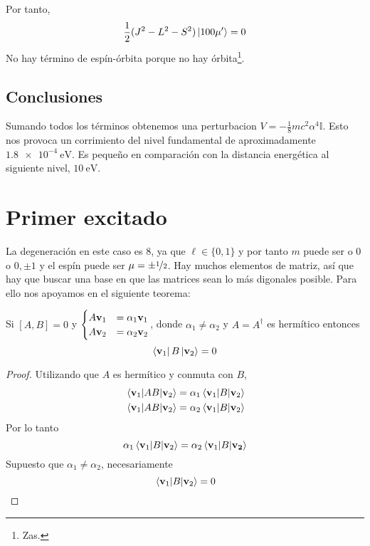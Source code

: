 Por tanto,
\begin{equation}
  \frac{1}{2}(J^2-L^2-S^2) \ket{100\mu'} = 0
\end{equation}
No hay término de espín-órbita porque no hay órbita\footnote{Zas.}.

\subsection{Conclusiones}
Sumando todos los términos obtenemos una perturbacion
$V=-\frac{1}{8}mc^2\alpha^4 \mathbb{I}$. Esto nos provoca un
corrimiento del nivel fundamental de aproximadamente
$\SI{1.8e-4}{\eV}$. Es pequeño en comparación con la distancia
energética al siguiente nivel, $\SI{10}{\eV}$.



\section{Primer excitado}
La degeneración en este caso es 8, ya que $\ell\in\{0,1\}$ y por tanto $m$
puede ser o $0$ o $0,\pm 1$ y el espín puede ser $\mu = \pm
{\nicefrac{1}{2}}$.
Hay muchos elementos de matriz, así que hay que buscar una base en que
las matrices sean lo más digonales posible. Para ello nos apoyamos en
el siguiente teorema:
\begin{thm}
  Si $[A,B]=0$ y $
  \begin{cases}
    A \bm{\mathrm{v}}_1 &= \alpha_1 \bm{\mathrm{v}}_1 \\
    A \bm{\mathrm{v}}_2 &= \alpha_2 \bm{\mathrm{v}}_2 
  \end{cases}
$, donde $\alpha_1 \neq \alpha_2$ y $A=A^\dagger$ es hermítico entonces
\begin{equation}
  \bra{\bm{\mathrm{v}}_1}B \ket{\bm{\mathrm{v}}_2} = 0
\end{equation}
\label{thm:conmutediagonal}
\end{thm}
\begin{proof}
  Utilizando que $A$ es hermítico y conmuta con $B$,
  \begin{align}
    \matrixel{\boldrm{v}_1}{AB}{\boldrm{v}_2} &= \alpha_1
\matrixel{\boldrm{v}_1}{B}{\boldrm{v}_2} \\
    \matrixel{\boldrm{v}_1}{AB}{\boldrm{v}_2} &= \alpha_2
\matrixel{\boldrm{v}_1}{B}{\boldrm{v}_2} 
  \end{align}
  Por lo tanto
  \begin{equation}
    \alpha_1 \matrixel{\boldrm{v}_1}{B}{\boldrm{v}_2} = \alpha_2 \matrixel{\boldrm{v}_1}{B}{\boldrm{v_2}}
  \end{equation}
  Supuesto que $\alpha_1 \neq \alpha_2$, necesariamente
  \begin{equation}
    \matrixel{\boldrm{v}_1}{B}{\boldrm{v}_2} = 0
  \end{equation}

\end{proof}
